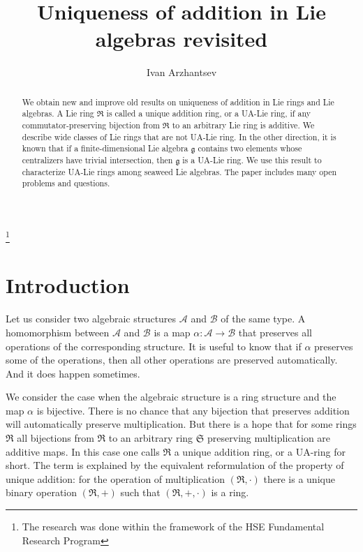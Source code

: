 \documentclass[a4paper,draft,reqno,12pt]{amsart}
\theoremstyle{definition}
\theoremstyle{remark}
\def\AAA{\mathcal{A}}
\def\BBB{\mathcal{B}}
\def\RRR{\mathfrak{R}}
\def\SSS{\mathfrak{S}}
\def\ggg{\mathfrak{g}}
\begin{document}
\date{}
\title[Uniqueness of addition in Lie algebras]{Uniqueness of addition in Lie algebras revisited}
\author{Ivan Arzhantsev}
\address{Faculty of Computer Science, HSE University, Pokrovsky Boulevard 11, Moscow, 109028 Russia}
%
\thanks{The research was done within the framework of the HSE Fundamental Research Program}
%
%

\maketitle
%
\begin{abstract}
We obtain new and improve old results on uniqueness of addition in Lie rings and Lie algebras. A Lie ring $\RRR$ is called a unique addition ring, or a UA-Lie ring, if any commutator-preserving bijection from $\RRR$ to an arbitrary Lie ring is additive. We describe wide classes of Lie rings that are not UA-Lie ring. In the other direction, it is known that if a finite-dimensional Lie algebra $\ggg$ contains two elements whose centralizers have trivial intersection, then $\ggg$ is a UA-Lie ring. We use this result to characterize UA-Lie rings among seaweed Lie algebras. The paper includes many open problems and questions. 
\end{abstract} 


\section{Introduction}
\label{sec1}

Let us consider two algebraic structures $\AAA$ and $\BBB$ of the same type. A homomorphism between $\AAA$ and $\BBB$ is a map $\alpha\colon\AAA\to\BBB$ that preserves all operations of the corresponding structure. It is useful to know that if $\alpha$ preserves some of the operations, then all other operations are preserved automatically. And it does happen sometimes. 

We consider the case when the algebraic structure is a ring structure and the map $\alpha$ is bijective. There is no chance that any bijection that preserves addition will automatically preserve multiplication. But there is a hope that for some rings $\RRR$ all bijections from $\RRR$ to an arbitrary ring $\SSS$ preserving multiplication are additive maps. In this case one calls $\RRR$ a unique addition ring, or a UA-ring for short. The term is explained by the equivalent reformulation of the property of unique addition: for the operation of multiplication $(\RRR,\cdot)$  there is a unique binary operation $(\RRR,+)$ such that $(\RRR,+,\cdot)$ is a ring.
\end{document}
